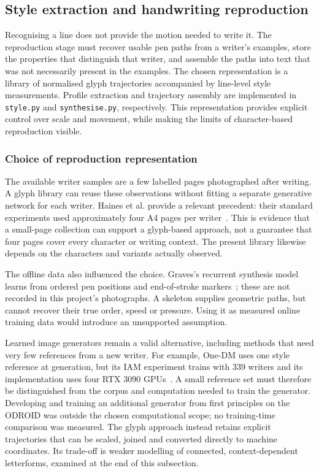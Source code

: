 \subsection{Style extraction and handwriting reproduction}
\label{sec:des-reproduction}
Recognising a line does not provide the motion needed to write it. The reproduction stage must recover usable pen paths from a writer's examples, store the properties that distinguish that writer, and assemble the paths into text that was not necessarily present in the examples. The chosen representation is a library of normalised glyph trajectories accompanied by line-level style measurements. Profile extraction and trajectory assembly are implemented in \texttt{style.py} and \texttt{synthesise.py}, respectively. This representation provides explicit control over scale and movement, while making the limits of character-based reproduction visible.

\subsubsection{Choice of reproduction representation}
The available writer samples are a few labelled pages photographed after writing. A glyph library can reuse these observations without fitting a separate generative network for each writer. Haines et al. provide a relevant precedent: their standard experiments used approximately four A4 pages per writer~\cite[p.~4]{haines2016}. This is evidence that a small-page collection can support a glyph-based approach, not a guarantee that four pages cover every character or writing context. The present library likewise depends on the characters and variants actually observed.

The offline data also influenced the choice. Graves's recurrent synthesis model learns from ordered pen positions and end-of-stroke markers~\cite[p.~18]{graves2013}; these are not recorded in this project's photographs. A skeleton supplies geometric paths, but cannot recover their true order, speed or pressure. Using it as measured online training data would introduce an unsupported assumption.

Learned image generators remain a valid alternative, including methods that need very few references from a new writer. For example, One-DM uses one style reference at generation, but its IAM experiment trains with 339 writers and its implementation uses four RTX 3090 GPUs~\cite[p.~9]{dai2024}. A small reference set must therefore be distinguished from the corpus and computation needed to train the generator. Developing and training an additional generator from first principles on the ODROID was outside the chosen computational scope; no training-time comparison was measured. The glyph approach instead retains explicit trajectories that can be scaled, joined and converted directly to machine coordinates. Its trade-off is weaker modelling of connected, context-dependent letterforms, examined at the end of this subsection.

